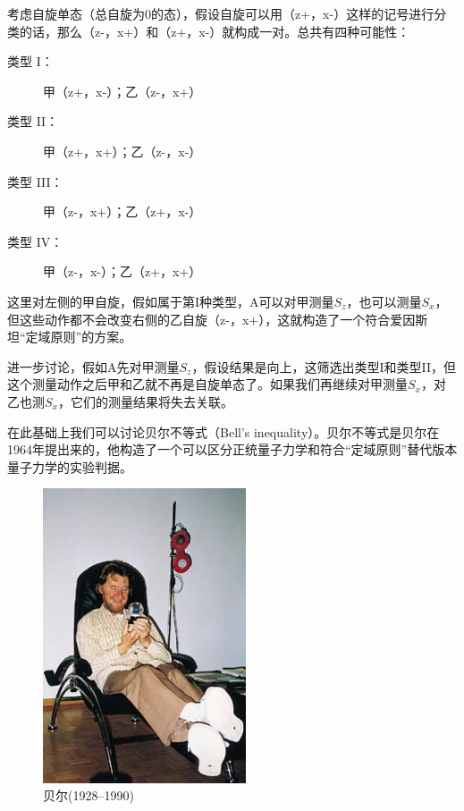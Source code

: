 考虑自旋单态（总自旋为0的态），假设自旋可以用（z+，x-）这样的记号进行分类的话，那么（z-，x+）和（z+，x-）就构成一对。总共有四种可能性：

\begin{description}
\item[类型 I：] 

甲（z+，x-）；乙（z-，x+）

\item[类型 II：] 

甲（z+，x+）；乙（z-，x-）

\item[类型 III：]

甲（z-，x+）；乙（z+，x-）

\item[类型 IV：]

甲（z-，x-）；乙（z+，x+）

\end{description}

这里对左侧的甲自旋，假如属于第I种类型，A可以对甲测量$S_z$，也可以测量$S_x$，但这些动作都不会改变右侧的乙自旋（z-，x+），这就构造了一个符合爱因斯坦“定域原则”的方案。

进一步讨论，假如A先对甲测量$S_z$，假设结果是向上，这筛选出类型I和类型II，但这个测量动作之后甲和乙就不再是自旋单态了。如果我们再继续对甲测量$S_x$，对乙也测$S_x$，它们的测量结果将失去关联。

在此基础上我们可以讨论贝尔不等式（Bell's inequality）。贝尔不等式是贝尔在1964年提出来的，他构造了一个可以区分正统量子力学和符合“定域原则”替代版本量子力学的实验判据。

\begin{figure}[htbp]
\begin{center}
\includegraphics[width=6cm]{IdenticalParticles/john_s_bell.gif}
\caption{贝尔(1928--1990)}
\end{center}
\end{figure}


